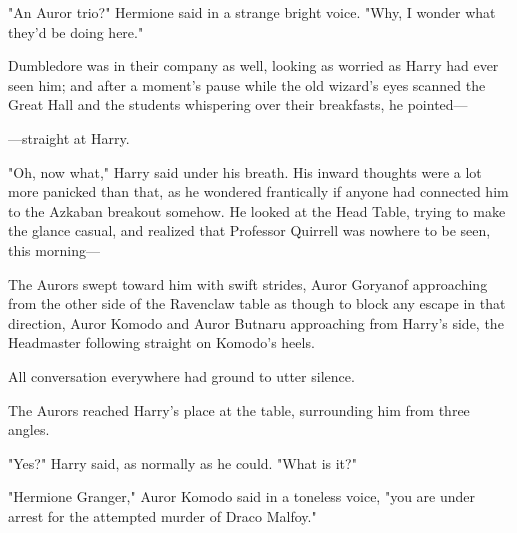 "An Auror trio?" Hermione said in a strange bright voice. "Why, I wonder what 
they'd be doing here."

Dumbledore was in their company as well, looking as worried as Harry had ever 
seen him; and after a moment's pause while the old wizard's eyes scanned the 
Great Hall and the students whispering over their breakfasts, he pointed---

---straight at Harry.

"Oh, now what," Harry said under his breath. His inward thoughts were a lot 
more panicked than that, as he wondered frantically if anyone had connected him 
to the Azkaban breakout somehow. He looked at the Head Table, trying to make 
the glance casual, and realized that Professor Quirrell was nowhere to be seen, 
this morning---

The Aurors swept toward him with swift strides, Auror Goryanof approaching from 
the other side of the Ravenclaw table as though to block any escape in that 
direction, Auror Komodo and Auror Butnaru approaching from Harry's side, the 
Headmaster following straight on Komodo's heels.

All conversation everywhere had ground to utter silence.

The Aurors reached Harry's place at the table, surrounding him from three 
angles.

"Yes?" Harry said, as normally as he could. "What is it?"

"Hermione Granger," Auror Komodo said in a toneless voice, "you are under 
arrest for the attempted murder of Draco Malfoy."
